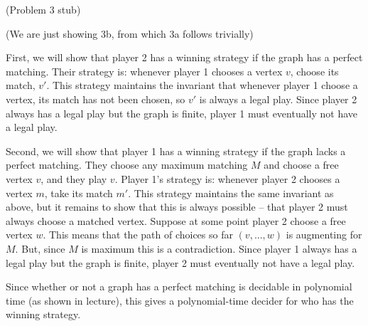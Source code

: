 \documentclass{hmcpset}
\begin{document}
\begin{problem}[3]
(Problem 3 stub)
\end{problem}
\begin{solution}
(We are just showing 3b, from which 3a follows trivially)

First, we will show that player 2 has a winning strategy if the graph has a perfect matching. Their strategy is: whenever player 1 chooses a vertex $v$, choose its match, $v'$. This strategy maintains the invariant that whenever player 1 choose a vertex, its match has not been chosen, so $v'$ is always a legal play. Since player 2 always has a legal play but the graph is finite, player 1 must eventually not have a legal play.

Second, we will show that player 1 has a winning strategy if the graph lacks a perfect matching. They choose any maximum matching $M$ and choose a free vertex $v$, and they play $v$. Player 1's strategy is: whenever player 2 chooses a vertex $m$, take its match $m'$. This strategy maintains the same invariant as above, but it remains to show that this is always possible -- that player 2 must always choose a matched vertex. Suppose at some point player 2 choose a free vertex $w$. This means that the path of choices so far $(v,...,w)$ is augmenting for $M$. But, since $M$ is maximum this is a contradiction. Since player 1 always has a legal play but the graph is finite, player 2 must eventually not have a legal play.

Since whether or not a graph has a perfect matching is decidable in polynomial time (as shown in lecture), this gives a polynomial-time decider for who has the winning strategy.

\end{solution}
\end{document}
